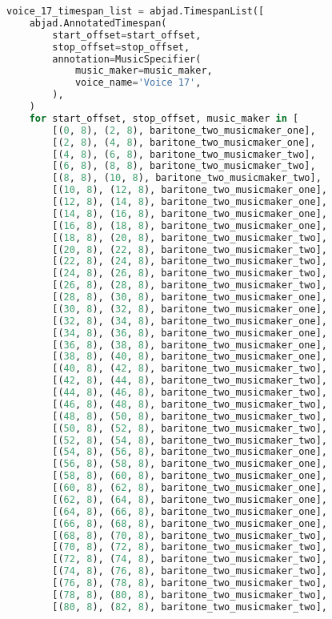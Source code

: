\begin{lstlisting}[language=Python, caption=Invocation Source Code]
voice_17_timespan_list = abjad.TimespanList([
    abjad.AnnotatedTimespan(
        start_offset=start_offset,
        stop_offset=stop_offset,
        annotation=MusicSpecifier(
            music_maker=music_maker,
            voice_name='Voice 17',
        ),
    )
    for start_offset, stop_offset, music_maker in [
        [(0, 8), (2, 8), baritone_two_musicmaker_one],
        [(2, 8), (4, 8), baritone_two_musicmaker_one],
        [(4, 8), (6, 8), baritone_two_musicmaker_two],
        [(6, 8), (8, 8), baritone_two_musicmaker_two],
        [(8, 8), (10, 8), baritone_two_musicmaker_two],
        [(10, 8), (12, 8), baritone_two_musicmaker_one],
        [(12, 8), (14, 8), baritone_two_musicmaker_one],
        [(14, 8), (16, 8), baritone_two_musicmaker_one],
        [(16, 8), (18, 8), baritone_two_musicmaker_one],
        [(18, 8), (20, 8), baritone_two_musicmaker_two],
        [(20, 8), (22, 8), baritone_two_musicmaker_two],
        [(22, 8), (24, 8), baritone_two_musicmaker_two],
        [(24, 8), (26, 8), baritone_two_musicmaker_two],
        [(26, 8), (28, 8), baritone_two_musicmaker_two],
        [(28, 8), (30, 8), baritone_two_musicmaker_one],
        [(30, 8), (32, 8), baritone_two_musicmaker_one],
        [(32, 8), (34, 8), baritone_two_musicmaker_one],
        [(34, 8), (36, 8), baritone_two_musicmaker_one],
        [(36, 8), (38, 8), baritone_two_musicmaker_one],
        [(38, 8), (40, 8), baritone_two_musicmaker_one],
        [(40, 8), (42, 8), baritone_two_musicmaker_two],
        [(42, 8), (44, 8), baritone_two_musicmaker_two],
        [(44, 8), (46, 8), baritone_two_musicmaker_two],
        [(46, 8), (48, 8), baritone_two_musicmaker_two],
        [(48, 8), (50, 8), baritone_two_musicmaker_two],
        [(50, 8), (52, 8), baritone_two_musicmaker_two],
        [(52, 8), (54, 8), baritone_two_musicmaker_two],
        [(54, 8), (56, 8), baritone_two_musicmaker_one],
        [(56, 8), (58, 8), baritone_two_musicmaker_one],
        [(58, 8), (60, 8), baritone_two_musicmaker_one],
        [(60, 8), (62, 8), baritone_two_musicmaker_one],
        [(62, 8), (64, 8), baritone_two_musicmaker_one],
        [(64, 8), (66, 8), baritone_two_musicmaker_one],
        [(66, 8), (68, 8), baritone_two_musicmaker_one],
        [(68, 8), (70, 8), baritone_two_musicmaker_two],
        [(70, 8), (72, 8), baritone_two_musicmaker_two],
        [(72, 8), (74, 8), baritone_two_musicmaker_two],
        [(74, 8), (76, 8), baritone_two_musicmaker_two],
        [(76, 8), (78, 8), baritone_two_musicmaker_two],
        [(78, 8), (80, 8), baritone_two_musicmaker_two],
        [(80, 8), (82, 8), baritone_two_musicmaker_two],

\end{lstlisting}
